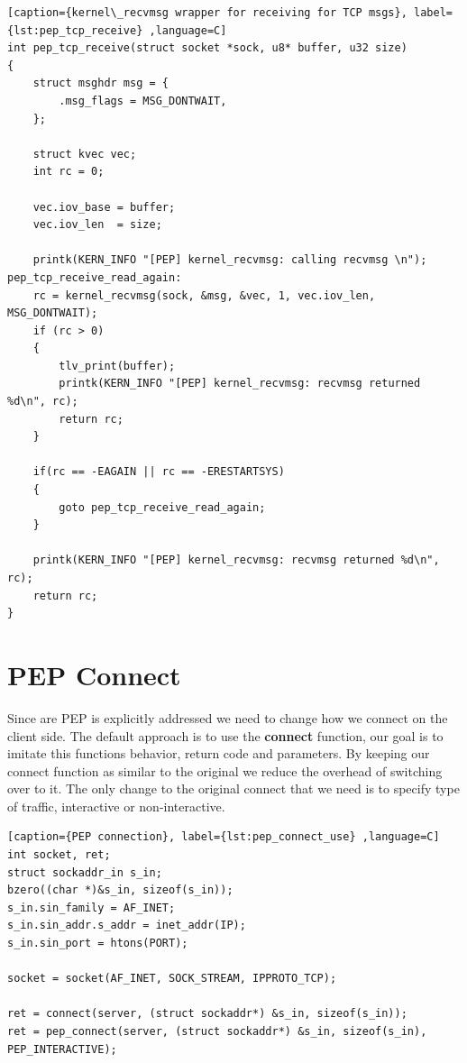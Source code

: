 \documentclass[a4paper,english, 11pt]{report}
\begin{document}
\begin{lstlisting}[caption={kernel\_recvmsg wrapper for receiving for TCP msgs}, label={lst:pep_tcp_receive} ,language=C]
int pep_tcp_receive(struct socket *sock, u8* buffer, u32 size)
{
	struct msghdr msg = {
		.msg_flags = MSG_DONTWAIT,
	};

	struct kvec vec;
	int rc = 0;

	vec.iov_base = buffer;
	vec.iov_len  = size;

	printk(KERN_INFO "[PEP] kernel_recvmsg: calling recvmsg \n");
pep_tcp_receive_read_again:
	rc = kernel_recvmsg(sock, &msg, &vec, 1, vec.iov_len, MSG_DONTWAIT);
	if (rc > 0)
	{
		tlv_print(buffer);
		printk(KERN_INFO "[PEP] kernel_recvmsg: recvmsg returned %d\n", rc);
		return rc;
	}

	if(rc == -EAGAIN || rc == -ERESTARTSYS)
	{
		goto pep_tcp_receive_read_again;
	}

	printk(KERN_INFO "[PEP] kernel_recvmsg: recvmsg returned %d\n", rc);
	return rc;
}
\end{lstlisting}


\section{PEP Connect}
Since are PEP is explicitly addressed we need to change how we connect on the client side.
The default approach is to use the \textbf{connect} function, our goal is to imitate this functions behavior, return code and parameters. By keeping our connect function as similar to the original we reduce the overhead of switching over to it. The only change to the original connect that we need is to specify type of traffic, interactive or non-interactive.
\begin{lstlisting}[caption={PEP connection}, label={lst:pep_connect_use} ,language=C]
int socket, ret;
struct sockaddr_in s_in;
bzero((char *)&s_in, sizeof(s_in));
s_in.sin_family = AF_INET;
s_in.sin_addr.s_addr = inet_addr(IP);
s_in.sin_port = htons(PORT);

socket = socket(AF_INET, SOCK_STREAM, IPPROTO_TCP);

ret = connect(server, (struct sockaddr*) &s_in, sizeof(s_in));
ret = pep_connect(server, (struct sockaddr*) &s_in, sizeof(s_in), PEP_INTERACTIVE);
\end{lstlisting}
\end{document}
